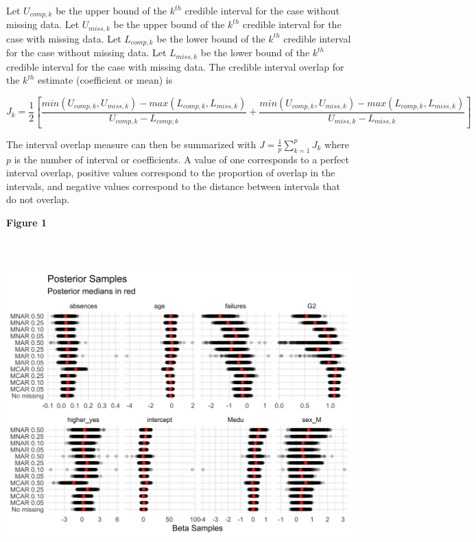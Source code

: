 \documentclass[11pt]{article}
\begin{document}
Let $U_{comp,k}$ be the upper bound of the $k^{th}$ credible interval for the case without missing data. Let $U_{miss,k}$ be the upper bound of the $k^{th}$ credible interval for the case with missing data. Let $L_{comp,k}$ be the lower bound of the $k^{th}$ credible interval for the case without missing data. Let $L_{miss,k}$ be the lower bound of the $k^{th}$ credible interval for the case with missing data. The credible interval overlap for the $k^{th}$ estimate (coefficient or mean) is 

$$J_k = \frac{1}{2}\left[\frac{min(U_{comp,k}, U_{miss,k}) - max(L_{comp,k}, L_{miss,k})}{U_{comp,k} - L_{comp,k}} + \frac{min(U_{comp,k}, U_{miss,k}) - max(L_{comp,k}, L_{miss,k})}{U_{miss,k} - L_{miss,k}}\right]$$

The interval overlap measure can then be summarized with $J = \frac{1}{p}\sum_{k = 1}^pJ_k$ where $p$ is the number of interval or coefficients. A value of one corresponds to a perfect interval overlap, positive values correspond to the proportion of overlap in the intervals, and negative values correspond to the distance between intervals that do not overlap. 

\vspace{0.25in}

\textbf{Figure 1}

\includegraphics[width=6.5in, height=5in]{posterior-samples-1}
\end{document}
